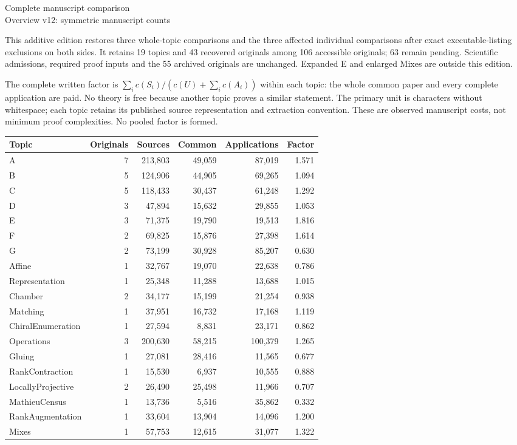 \documentclass[11pt,a4paper]{article}
\begin{document}
\begin{center}{\Large Complete manuscript comparison}\\[3pt]
Overview v12: symmetric manuscript counts\end{center}
This additive edition restores three whole-topic comparisons and the three affected individual comparisons after exact executable-listing exclusions on both sides. It retains 19 topics and 43 recovered originals among 106 accessible originals; 63 remain pending. Scientific admissions, required proof inputs and the 55 archived originals are unchanged. Expanded E and enlarged Mixes are outside this edition.

The complete written factor is $\sum_i c(S_i)/(c(U)+\sum_i c(A_i))$ within each topic: the whole common paper and every complete application are paid. No theory is free because another topic proves a similar statement. The primary unit is characters without whitespace; each topic retains its published source representation and extraction convention. These are observed manuscript costs, not minimum proof complexities. No pooled factor is formed.
\begin{center}\small\begin{tabular}{lrrrrr}\toprule
Topic & Originals & Sources & Common & Applications & Factor\\\midrule
A & 7 & 213,803 & 49,059 & 87,019 & 1.571 \\
B & 5 & 124,906 & 44,905 & 69,265 & 1.094 \\
C & 5 & 118,433 & 30,437 & 61,248 & 1.292 \\
D & 3 & 47,894 & 15,632 & 29,855 & 1.053 \\
E & 3 & 71,375 & 19,790 & 19,513 & 1.816 \\
F & 2 & 69,825 & 15,876 & 27,398 & 1.614 \\
G & 2 & 73,199 & 30,928 & 85,207 & 0.630 \\
Affine & 1 & 32,767 & 19,070 & 22,638 & 0.786 \\
Representation & 1 & 25,348 & 11,288 & 13,688 & 1.015 \\
Chamber & 2 & 34,177 & 15,199 & 21,254 & 0.938 \\
Matching & 1 & 37,951 & 16,732 & 17,168 & 1.119 \\
ChiralEnumeration & 1 & 27,594 & 8,831 & 23,171 & 0.862 \\
Operations & 3 & 200,630 & 58,215 & 100,379 & 1.265 \\
Gluing & 1 & 27,081 & 28,416 & 11,565 & 0.677 \\
RankContraction & 1 & 15,530 & 6,937 & 10,555 & 0.888 \\
LocallyProjective & 2 & 26,490 & 25,498 & 11,966 & 0.707 \\
MathieuCensus & 1 & 13,736 & 5,516 & 35,862 & 0.332 \\
RankAugmentation & 1 & 33,604 & 13,904 & 14,096 & 1.200 \\
Mixes & 1 & 57,753 & 12,615 & 31,077 & 1.322 \\
\bottomrule\end{tabular}\end{center}
\end{document}
